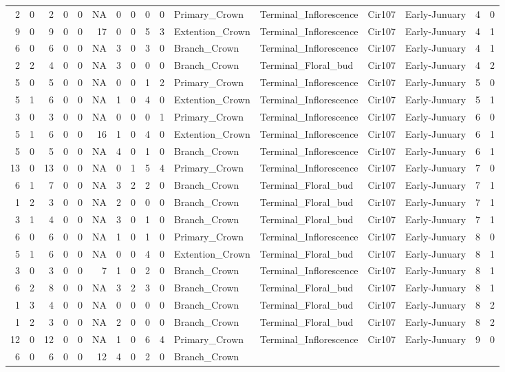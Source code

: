 \documentclass[]{article}
\begin{document}
\begin{longtable}[]{@{}rrrrrrrrrrllllrl@{}}
2 & 0 & 2 & 0 & 0 & NA & 0 & 0 & 0 & 0 & Primary\_Crown &
Terminal\_Inflorescence & Cir107 & Early-Junuary & 4 & 0\tabularnewline
9 & 0 & 9 & 0 & 0 & 17 & 0 & 0 & 5 & 3 & Extention\_Crown &
Terminal\_Inflorescence & Cir107 & Early-Junuary & 4 & 1\tabularnewline
6 & 0 & 6 & 0 & 0 & NA & 3 & 0 & 3 & 0 & Branch\_Crown &
Terminal\_Inflorescence & Cir107 & Early-Junuary & 4 & 1\tabularnewline
2 & 2 & 4 & 0 & 0 & NA & 3 & 0 & 0 & 0 & Branch\_Crown &
Terminal\_Floral\_bud & Cir107 & Early-Junuary & 4 & 2\tabularnewline
5 & 0 & 5 & 0 & 0 & NA & 0 & 0 & 1 & 2 & Primary\_Crown &
Terminal\_Inflorescence & Cir107 & Early-Junuary & 5 & 0\tabularnewline
5 & 1 & 6 & 0 & 0 & NA & 1 & 0 & 4 & 0 & Extention\_Crown &
Terminal\_Inflorescence & Cir107 & Early-Junuary & 5 & 1\tabularnewline
3 & 0 & 3 & 0 & 0 & NA & 0 & 0 & 0 & 1 & Primary\_Crown &
Terminal\_Inflorescence & Cir107 & Early-Junuary & 6 & 0\tabularnewline
5 & 1 & 6 & 0 & 0 & 16 & 1 & 0 & 4 & 0 & Extention\_Crown &
Terminal\_Inflorescence & Cir107 & Early-Junuary & 6 & 1\tabularnewline
5 & 0 & 5 & 0 & 0 & NA & 4 & 0 & 1 & 0 & Branch\_Crown &
Terminal\_Inflorescence & Cir107 & Early-Junuary & 6 & 1\tabularnewline
13 & 0 & 13 & 0 & 0 & NA & 0 & 1 & 5 & 4 & Primary\_Crown &
Terminal\_Inflorescence & Cir107 & Early-Junuary & 7 & 0\tabularnewline
6 & 1 & 7 & 0 & 0 & NA & 3 & 2 & 2 & 0 & Branch\_Crown &
Terminal\_Floral\_bud & Cir107 & Early-Junuary & 7 & 1\tabularnewline
1 & 2 & 3 & 0 & 0 & NA & 2 & 0 & 0 & 0 & Branch\_Crown &
Terminal\_Floral\_bud & Cir107 & Early-Junuary & 7 & 1\tabularnewline
3 & 1 & 4 & 0 & 0 & NA & 3 & 0 & 1 & 0 & Branch\_Crown &
Terminal\_Floral\_bud & Cir107 & Early-Junuary & 7 & 1\tabularnewline
6 & 0 & 6 & 0 & 0 & NA & 1 & 0 & 1 & 0 & Primary\_Crown &
Terminal\_Inflorescence & Cir107 & Early-Junuary & 8 & 0\tabularnewline
5 & 1 & 6 & 0 & 0 & NA & 0 & 0 & 4 & 0 & Extention\_Crown &
Terminal\_Floral\_bud & Cir107 & Early-Junuary & 8 & 1\tabularnewline
3 & 0 & 3 & 0 & 0 & 7 & 1 & 0 & 2 & 0 & Branch\_Crown &
Terminal\_Inflorescence & Cir107 & Early-Junuary & 8 & 1\tabularnewline
6 & 2 & 8 & 0 & 0 & NA & 3 & 2 & 3 & 0 & Branch\_Crown &
Terminal\_Floral\_bud & Cir107 & Early-Junuary & 8 & 1\tabularnewline
1 & 3 & 4 & 0 & 0 & NA & 0 & 0 & 0 & 0 & Branch\_Crown &
Terminal\_Floral\_bud & Cir107 & Early-Junuary & 8 & 2\tabularnewline
1 & 2 & 3 & 0 & 0 & NA & 2 & 0 & 0 & 0 & Branch\_Crown &
Terminal\_Floral\_bud & Cir107 & Early-Junuary & 8 & 2\tabularnewline
12 & 0 & 12 & 0 & 0 & NA & 1 & 0 & 6 & 4 & Primary\_Crown &
Terminal\_Inflorescence & Cir107 & Early-Junuary & 9 & 0\tabularnewline
6 & 0 & 6 & 0 & 0 & 12 & 4 & 0 & 2 & 0 & Branch\_Crown &

\end{longtable}
\end{document}
